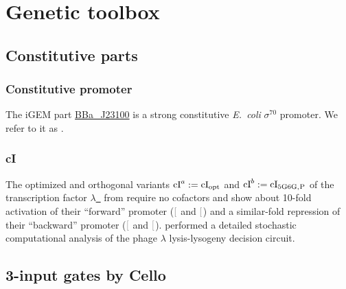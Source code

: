 \documentclass[12pt,notitlepage]{article}
\let\cite\citep
\newcommand{\cbra}[1]{{\ensuremath{\color{gray}{#1}}}}
\newcommand{\promoter}[1]{{{\cbra{[}\ce{#1}\cbra{]}}}}
\begin{document}
%




\section{Genetic toolbox} \label{s:genetic}


\subsection{Constitutive parts} \label{ss:const}

\subsubsection*{Constitutive promoter} \label{ss:Pc}


The iGEM part 
\href{http://parts.igem.org/Part:BBa_J23100}{BBa\_J23100}
is a strong constitutive \emph{E.~coli} $\sigma^{70}$ promoter.
%
We refer to it as . 
%




\subsubsection*{cI} \label{ss:cI}

The optimized and orthogonal variants
$\ce{cI^a} := \ce{cI_{opt}}$
and
$\ce{cI^b} := \ce{cI_{5G6G,P}}$
of the transcription factor 
\href{https://www.uniprot.org/uniprot/P03034}{$\lambda$~}
from
\cite[\href{https://www.nature.com/articles/ncomms13858/figures/4}{Fig.~4c/d}]{BroedelJaramilloIsalan2016}
require no cofactors and 
show 
about 10-fold activation of their
``forward'' promoter
(\promoter{cI^a_+} and \promoter{cI^b_+})
and 
a similar-fold repression of their 
``backward'' promoter
(\promoter{cI^a_-} and \promoter{cI^b_-}).
%
%
\citet{ArkinRossMcAdams1998}
performed 
a detailed stochastic computational analysis of
the phage $\lambda$ lysis-lysogeny decision circuit.


\subsection{3-input gates by Cello} \label{ss:cello}
\end{document}
